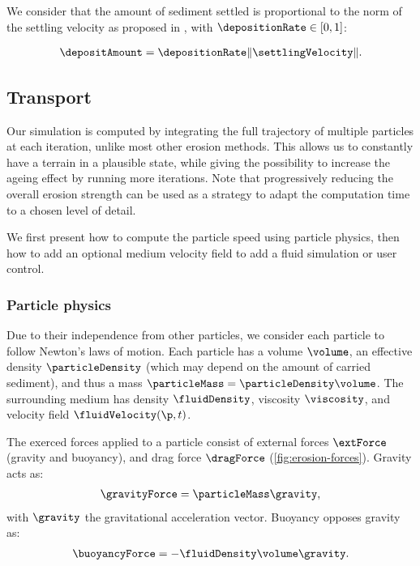 We consider that the amount of sediment settled is proportional to the norm of the settling velocity as proposed in \cite{Wojtan2007}, with $\depositionRate \in [0,1]$: 

\begin{align}
    \label{eq:erosion-deltaDepositon}
    \depositAmount = \depositionRate \|\settlingVelocity\|.
\end{align}

\subsection{Transport}
Our simulation is computed by integrating the full trajectory of multiple particles at each iteration, unlike most other erosion methods. This allows us to constantly have a terrain in a plausible state, while giving the possibility to increase the ageing effect by running more iterations. 
Note that progressively reducing the overall erosion strength can be used as a strategy to adapt the computation time to a chosen level of detail.

We first present how to compute the particle speed using particle physics, then how to add an optional medium velocity field to add a fluid simulation or user control.


\subsubsection{Particle physics}
Due to their independence from other particles, we consider each particle to follow Newton's laws of motion. Each particle has a volume $\volume$, an effective density $\particleDensity$ (which may depend on the amount of carried sediment), and thus a mass $\particleMass = \particleDensity \volume$. The surrounding medium has density $\fluidDensity$, viscosity $\viscosity$, and velocity field $\fluidVelocity(\p,t)$.

The exerced forces applied to a particle consist of external forces $\extForce$ (gravity and buoyancy), and drag force $\dragForce$ (\cref{fig:erosion-forces}). Gravity acts as:
\begin{align}
    \gravityForce = \particleMass \gravity,
\end{align}
with $\gravity$ the gravitational acceleration vector. Buoyancy opposes gravity as:
\begin{align}
    \buoyancyForce = -\fluidDensity \volume \gravity.
\end{align}

